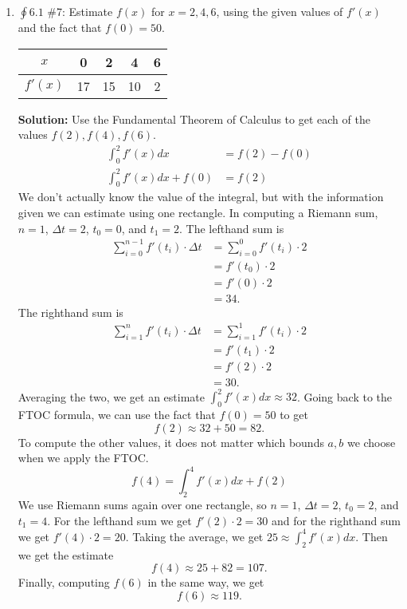 \documentclass[11pt,letterpaper]{article}
\begin{document}
\begin{enumerate}
\item $\oint 6.1$ \#7: Estimate $f(x)$ for $x=2,4,6$, using the given values of $f'(x)$ and the fact that $f(0)=50$. \\
\begin{center}
\begin{tabular}{c|c|c|c|c}
\hline
$x$ & 0 & 2 & 4 & 6 \\ [0.5ex]
\hline 
$f'(x)$ & 17 & 15 & 10 & 2 \\ [0.5ex]
\hline
\end{tabular}
\end{center} 
\vspace{1pc}
{\bf Solution:} Use the Fundamental Theorem of Calculus to get each of the values $f(2),f(4),f(6)$.
\begin{align*}
\int_0^2f'(x)dx &= f(2)-f(0) \\
\int_0^2f'(x)dx +f(0) &= f(2)
\end{align*}
We don't actually know the value of the integral, but with the information given we can estimate using one rectangle.  In computing a Riemann sum, $n=1$, $\Delta t=2$, $t_0=0$, and $t_1=2$.  The lefthand sum is
\begin{align*}
\sum_{i=0}^{n-1}f'(t_i)\cdot\Delta t &=\sum_{i=0}^0f'(t_i)\cdot 2 \\
&= f'(t_0)\cdot 2 \\
&= f'(0)\cdot 2 \\
&= 34.
\end{align*}
The righthand sum is
\begin{align*}
\sum_{i=1}^{n}f'(t_i)\cdot\Delta t &=\sum_{i=1}^1f'(t_i)\cdot 2 \\
&= f'(t_1)\cdot 2 \\
&= f'(2)\cdot 2 \\
&= 30.
\end{align*}
Averaging the two, we get an estimate $\int_0^2f'(x)dx\approx 32$.  Going back to the FTOC formula, we can use the fact that $f(0)=50$ to get 
\[f(2)\approx 32+50=82.\]
To compute the other values, it does not matter which bounds $a,b$ we choose when we apply the FTOC.
\[f(4)=\int_2^4f'(x)dx+f(2)\]
We use Riemann sums again over one rectangle, so $n=1$, $\Delta t=2$, $t_0=2$, and $t_1=4$.  For the lefthand sum we get $f'(2)\cdot 2=30$ and for the righthand sum we get $f'(4)\cdot 2=20$.  Taking the average, we get $25\approx\int_2^4f'(x)dx$.  Then we get the estimate
\[f(4)\approx 25+82=107.\]
Finally, computing $f(6)$ in the same way, we get
\[f(6)\approx 119.\]


\end{enumerate}
\end{document}
